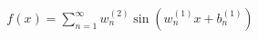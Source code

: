 \documentclass[preview]{standalone}
\begin{document}
\begin{align*}
f(x) = \sum_{n=1}^{\infty} w_n^{(2)} \sin(w_n^{(1)} x + b_n^{(1)})
\end{align*}
\end{document}
